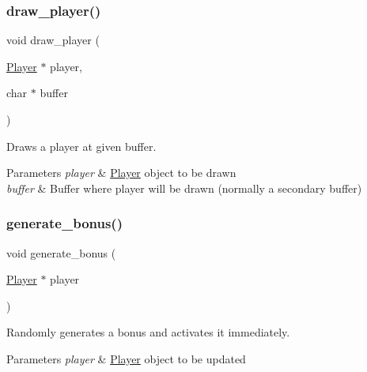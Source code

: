 \subsubsection{\texorpdfstring{draw\+\_\+player()}{draw\_player()}}
{\footnotesize\ttfamily void draw\+\_\+player (\begin{DoxyParamCaption}\item[{\hyperlink{struct_player}{Player} $\ast$}]{player,  }\item[{char $\ast$}]{buffer }\end{DoxyParamCaption})}



Draws a player at given buffer. 


\begin{DoxyParams}{Parameters}
{\em player} & \hyperlink{struct_player}{Player} \textquotesingle{}object\textquotesingle{} to be drawn \\
\hline
{\em buffer} & Buffer where player will be drawn (normally a secondary buffer) \\
\hline
\end{DoxyParams}
\hypertarget{group__player_gafa760c994949e72cc685e338eca386e6}{}\label{group__player_gafa760c994949e72cc685e338eca386e6} 
\subsubsection{\texorpdfstring{generate\+\_\+bonus()}{generate\_bonus()}}
{\footnotesize\ttfamily void generate\+\_\+bonus (\begin{DoxyParamCaption}\item[{\hyperlink{struct_player}{Player} $\ast$}]{player }\end{DoxyParamCaption})}



Randomly generates a bonus and activates it immediately. 


\begin{DoxyParams}{Parameters}
{\em player} & \hyperlink{struct_player}{Player} \textquotesingle{}object\textquotesingle{} to be updated \\
\hline
\end{DoxyParams}
\hypertarget{group__player_ga22a8eae795d9bddb858ac84d0e7371ed}{}\label{group__player_ga22a8eae795d9bddb858ac84d0e7371ed} 
